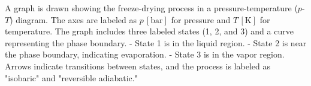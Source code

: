 A graph is drawn showing the freeze-drying process in a pressure-temperature (\( p \)-\( T \)) diagram. The axes are labeled as \( p \, [\text{bar}] \) for pressure and \( T \, [\text{K}] \) for temperature. The graph includes three labeled states (1, 2, and 3) and a curve representing the phase boundary.  
- State 1 is in the liquid region.  
- State 2 is near the phase boundary, indicating evaporation.  
- State 3 is in the vapor region.  
Arrows indicate transitions between states, and the process is labeled as "isobaric" and "reversible adiabatic."